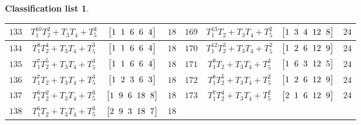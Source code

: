 \documentclass[pdftex]{sigma}%
\theoremstyle{definition}
\newtheorem{class-list}[thm]{Classification list}
\numberwithin{equation}{section}
\begin{document}
\begin{class-list}
\begin{table}[t!]
\begin{tabu}{c|c|c|c||c|c|c|c}
\\
\hline
${133}$&${T_{1}^{10}T_{2}^{2}+T_{3}T_{4}+T_{5}^{3}}$
&$\arraycolsep=1mm\begin{bmatrix}{1} & {1} & {6} & {6} & {4}\end{bmatrix}$&${18}$
&${169}$&${T_{1}^{13}T_{2}+T_{3}T_{4}+T_{5}^{2}}$
&$\arraycolsep=1mm\begin{bmatrix}{1} & {3} & {4} & {12} & {8}\end{bmatrix}$&${24}$
\\
\hline
${134}$&${T_{1}^{8}T_{2}^{4}+T_{3}T_{4}+T_{5}^{3}}$
&$\arraycolsep=1mm\begin{bmatrix}{1} & {1} & {6} & {6} & {4}\end{bmatrix}$&${18}$
&${170}$&${T_{1}^{12}T_{2}^{3}+T_{3}T_{4}+T_{5}^{2}}$
&$\arraycolsep=1mm\begin{bmatrix}{1} & {2} & {6} & {12} & {9}\end{bmatrix}$&${24}$
\\
\hline
${135}$&${T_{1}^{7}T_{2}^{5}+T_{3}T_{4}+T_{5}^{3}}$
&$\arraycolsep=1mm\begin{bmatrix}{1} & {1} & {6} & {6} & {4}\end{bmatrix}$&${18}$
&${171}$&${T_{1}^{9}T_{2}+T_{3}T_{4}+T_{5}^{3}}$
&$\arraycolsep=1mm\begin{bmatrix}{1} & {6} & {3} & {12} & {5}\end{bmatrix}$&${24}$
\\
\hline
${136}$&${T_{1}^{7}T_{2}+T_{3}T_{4}+T_{5}^{3}}$
&$\arraycolsep=1mm\begin{bmatrix}{1} & {2} & {3} & {6} & {3}\end{bmatrix}$&${18}$
&${172}$&${T_{1}^{8}T_{2}^{5}+T_{3}T_{4}+T_{5}^{2}}$
&$\arraycolsep=1mm\begin{bmatrix}{1} & {2} & {6} & {12} & {9}\end{bmatrix}$&${24}$
\\
\hline
${137}$&${T_{1}^{6}T_{2}^{2}+T_{3}T_{4}+T_{5}^{3}}$
&$\arraycolsep=1mm\begin{bmatrix}{1} & {9} & {6} & {18} & {8}\end{bmatrix}$&${18}$
&${173}$&${T_{1}^{7}T_{2}^{4}+T_{3}T_{4}+T_{5}^{2}}$
&$\arraycolsep=1mm\begin{bmatrix}{2} & {1} & {6} & {12} & {9}\end{bmatrix}$&${24}$
\\
\hline
${138}$&${T_{1}^{6}T_{2}+T_{3}T_{4}+T_{5}^{3}}$
&$\arraycolsep=1mm\begin{bmatrix}{2} & {9} & {3} & {18} & {7}\end{bmatrix}$&${18}$

\end{tabu}
\end{table}
\end{class-list}
\end{document}
